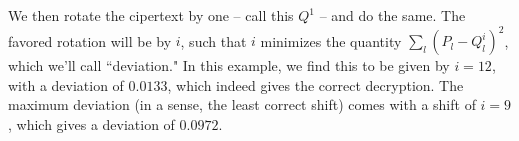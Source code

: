 \documentclass[12pt,letterpaper]{article}
\begin{document}
\begin{enumerate}
\begin{enumerate}
            We then rotate the cipertext by one -- call this $Q^1$ -- and do the same.
            The favored rotation will be by $i$, such that $i$ minimizes the quantity $\sum_l(P_l - Q^i_l)^2$, which we'll call ``deviation."
            In this example, we find this to be given by $i = 12$, with a deviation  of $0.0133$, which indeed gives the correct decryption.
            The maximum deviation (in a sense, the least correct shift) comes with a shift of $i = 9$, which gives a deviation of $0.0972$.
    \end{enumerate}



\end{enumerate}
\end{document}
